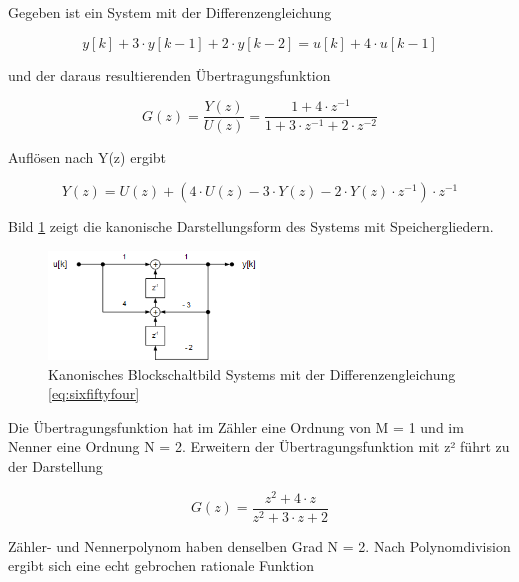 \noindent Gegeben ist ein System mit der Differenzengleichung

\begin{equation}\label{eq:sixfiftyfour}
y\left[k\right]+3\cdot y\left[k-1\right]+2\cdot y\left[k-2\right]=u\left[k\right]+4\cdot u\left[k-1\right] 
\end{equation}

\noindent und der daraus resultierenden \"{U}bertragungsfunktion 

\begin{equation}\label{eq:sixfiftyfive}
G\left(z\right)=\frac{Y\left(z\right)}{U\left(z\right)} =\frac{1+4\cdot z^{-1} }{1+3\cdot z^{-1} +2\cdot z^{-2} } 
\end{equation}

\noindent Aufl\"{o}sen nach Y(z) ergibt

\begin{equation}\label{eq:sixfiftysix}
Y\left(z\right)=U\left(z\right)+\left(4\cdot U\left(z\right)-3\cdot Y\left(z\right)-2\cdot Y\left(z\right)\cdot z^{-1} \right)\cdot z^{-1}
\end{equation}

\noindent Bild \ref{fig:SignalflussDirektstruktur2zBereichBeispiel} zeigt die kanonische Darstellungsform des Systems mit Speichergliedern.

\begin{figure}[H]
  \centerline{\includegraphics[width=0.5\textwidth]{Kapitel6/Bilder/image6.png}}
  \caption{Kanonisches Blockschaltbild Systems mit der Differenzengleichung \eqref{eq:sixfiftyfour}}
  \label{fig:SignalflussDirektstruktur2zBereichBeispiel}
\end{figure}

\noindent Die \"{U}bertragungsfunktion hat im Z\"{a}hler eine Ordnung von M = 1 und im Nenner eine Ordnung N = 2. Erweitern der \"{U}bertragungsfunktion mit z² f\"{u}hrt zu der Darstellung

\begin{equation}\label{eq:sixfiftyseven}
G\left(z\right)=\frac{z^{2} +4\cdot z}{z^{2} +3\cdot z+2}
\end{equation}

\noindent Z\"{a}hler- und Nennerpolynom haben denselben Grad N = 2. Nach Polynomdivision ergibt sich eine echt gebrochen rationale Funktion

